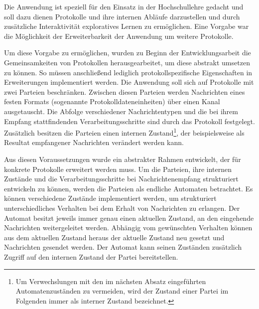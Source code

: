 
Die Anwendung ist speziell für den Einsatz in der Hochschullehre gedacht und soll dazu dienen Protokolle und ihre internen Abläufe darzustellen und durch zusätzliche Interaktivität exploratives Lernen zu ermöglichen. Eine Vorgabe war die Möglichkeit der Erweiterbarkeit der Anwendung um weitere Protokolle. 

Um diese Vorgabe zu ermöglichen, wurden zu Beginn der Entwicklungsarbeit die Gemeinsamkeiten von Protokollen herausgearbeitet, um diese abstrakt umsetzen zu können. So müssen anschließend lediglich protokollspezifische Eigenschaften in Erweiterungen implementiert werden. Die Anwendung soll sich auf Protokolle mit zwei Parteien beschränken. Zwischen diesen Parteien werden Nachrichten eines festen Formats (sogenannte Protokolldateneinheiten) über einen Kanal ausgetauscht. Die Abfolge verschiedener Nachrichtentypen und die bei ihrem Empfang stattfindenden Verarbeitungsschritte sind durch das Protokoll festgelegt. Zusätzlich besitzen die Parteien einen internen Zustand\footnote{
	Um Verwechslungen mit den im nächsten Absatz eingeführten Automatenzuständen zu vermeiden, wird der Zustand einer Partei im Folgenden immer als interner Zustand bezeichnet.
}, der beispielsweise als Resultat empfangener Nachrichten verändert werden kann. 

Aus diesen Voraussetzungen wurde ein abstrakter Rahmen entwickelt, der für konkrete Protokolle erweitert werden muss. Um die Parteien, ihre internen Zustände und die Verarbeitungsschritte bei Nachrichtenempfang strukturiert entwickeln zu können, werden die Parteien als endliche Automaten betrachtet. Es können verschiedene Zustände implementiert werden, um strukturiert unterschiedliches Verhalten bei dem Erhalt von Nachrichten zu erlangen. Der Automat besitzt jeweils immer genau einen aktuellen Zustand, an den eingehende Nachrichten weitergeleitet werden. Abhängig vom gewünschten Verhalten können aus dem aktuellen Zustand heraus der aktuelle Zustand neu gesetzt und Nachrichten gesendet werden. Der Automat kann seinen Zuständen zusätzlich Zugriff auf den internen Zustand der Partei bereitstellen.

